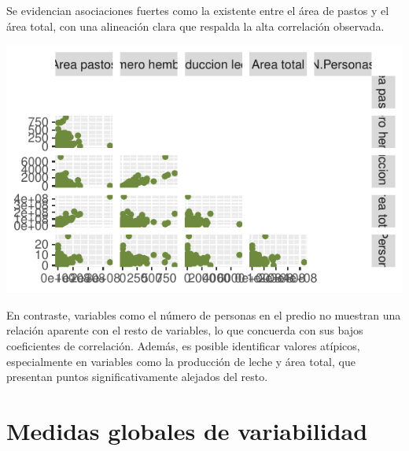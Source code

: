 \documentclass[]{tufte-handout}
\begin{document}
\begin{justify}
Se evidencian asociaciones fuertes como la existente entre el área de pastos y el área total, con una alineación clara que respalda la alta correlación observada. 
\begin{marginfigure}
\includegraphics[width=1.2\linewidth]{Informe_files/figure-latex/disp-1} \end{marginfigure}
En contraste, variables como el número de personas en el predio no muestran una relación aparente con el resto de variables, lo que concuerda con sus bajos coeficientes de correlación. Además, es posible identificar valores atípicos, especialmente en variables como la producción de leche y área total, que presentan puntos significativamente alejados del resto.
\end{justify}

\section{Medidas globales de
variabilidad}\label{medidas-globales-de-variabilidad}
\end{document}
